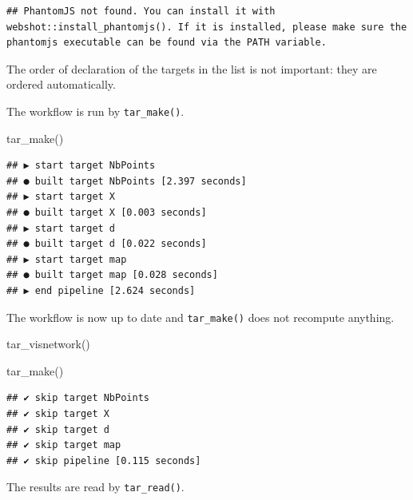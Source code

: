 \documentclass[
  12pt,
  american,
  a4paper,
  extrafontsizes,onecolumn,openright
  ]{memoir}
\newenvironment{Shaded}{\begin{snugshade}}{\end{snugshade}}
\newcommand{\FunctionTok}[1]{\textcolor[rgb]{0.00,0.00,0.00}{#1}}
\newcommand{\NormalTok}[1]{#1}
\begin{document}
\begin{verbatim}
## PhantomJS not found. You can install it with webshot::install_phantomjs(). If it is installed, please make sure the phantomjs executable can be found via the PATH variable.
\end{verbatim}

\normalsize

The order of declaration of the targets in the list is not important: they are ordered automatically.

The workflow is run by \texttt{tar\_make()}.

\scriptsize

\begin{Shaded}
\begin{Highlighting}[]
\FunctionTok{tar\_make}\NormalTok{()}
\end{Highlighting}
\end{Shaded}

\begin{verbatim}
## ▶ start target NbPoints
## ● built target NbPoints [2.397 seconds]
## ▶ start target X
## ● built target X [0.003 seconds]
## ▶ start target d
## ● built target d [0.022 seconds]
## ▶ start target map
## ● built target map [0.028 seconds]
## ▶ end pipeline [2.624 seconds]
\end{verbatim}

\normalsize

The workflow is now up to date and \texttt{tar\_make()} does not recompute anything.

\scriptsize

\begin{Shaded}
\begin{Highlighting}[]
\FunctionTok{tar\_visnetwork}\NormalTok{()}
\end{Highlighting}
\end{Shaded}

\begin{Shaded}
\begin{Highlighting}[]
\FunctionTok{tar\_make}\NormalTok{()}
\end{Highlighting}
\end{Shaded}

\begin{verbatim}
## ✔ skip target NbPoints
## ✔ skip target X
## ✔ skip target d
## ✔ skip target map
## ✔ skip pipeline [0.115 seconds]
\end{verbatim}

\normalsize

The results are read by \texttt{tar\_read()}.
\end{document}
